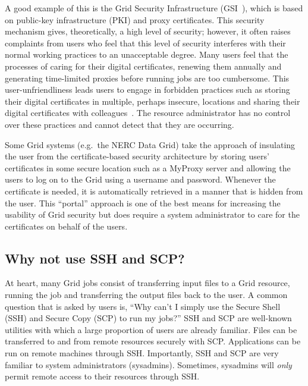 \documentclass[a4paper]{article}
\begin{document}
\begin{multicols}{2}
A good example of this is the Grid Security Infrastructure (GSI~\cite{gsi}), which is based on public-key infrastructure (PKI) and proxy certificates.  This security mechanism gives, theoretically, a high level of security; however, it often raises complaints from users who feel that this level of security interferes with their normal working practices to an unacceptable degree.  Many users feel that the processes of caring for their digital certificates, renewing them annually and generating time-limited proxies before running jobs are too cumbersome.  This user-unfriendliness leads users to engage in forbidden practices such as storing their digital certificates in multiple, perhaps insecure, locations and sharing their digital certificates with colleagues~\cite{beckles:2005}.  The resource administrator has no control over these practices and cannot detect that they are occurring.

Some Grid systems (e.g.\ the NERC Data Grid) take the approach of insulating the user from the certificate-based security architecture by storing users' certificates in some secure location such as a MyProxy server and allowing the users to log on to the Grid using a username and password.  Whenever the certificate is needed, it is automatically retrieved in a manner that is hidden from the user.  This ``portal'' approach is one of the best means for increasing the usability of Grid security but does require a system administrator to care for the certificates on behalf of the users.

\subsection{Why not use SSH and SCP?}
At heart, many Grid jobs consist of transferring input files to a Grid resource, running the job and transferring the output files back to the user.  A common question that is asked by users is, ``Why can't I simply use the Secure Shell (SSH) and Secure Copy (SCP) to run my jobs?''  SSH and SCP are 
well-known utilities with which a large proportion of users are already familiar.  Files can be transferred to and from remote resources securely with SCP.  Applications can be run on remote machines through SSH.  Importantly, SSH and SCP are very familiar to system administrators (sysadmins).  Sometimes, sysadmins will {\em only\/} permit remote access to their resources through SSH.


\end{multicols}
\end{document}
